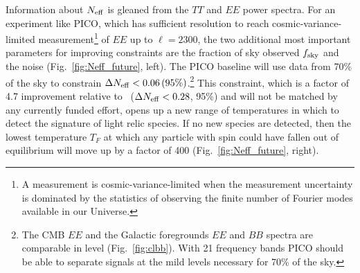 \documentclass[PICOReport.tex]{subfiles}
\begin{document}
Information about ${N_{\rm eff}}$ is gleaned from the $TT$ and $EE$ power spectra. For an experiment like PICO, which has sufficient resolution to reach cosmic-variance-limited measurement\footnote{A measurement is cosmic-variance-limited when the measurement uncertainty is dominated by the statistics of observing the finite number of Fourier modes available in our Universe.} of $EE$ up to $\ell =2300$, the two additional most important parameters for improving constraints are the fraction of sky observed $f_{\rm sky}$ and the noise (Fig.~\ref{fig:Neff_future}, left). The PICO baseline will use data from 70\% of the sky to constrain $\Delta {N_{\rm eff}} < 0.06 \, (95\%)$.\footnote{The CMB $EE$ and the Galactic foregrounds $EE$ and $BB$ spectra are comparable in level (Fig.~\ref{fig:clbb}). With 21 frequency bands PICO should be able to separate signals at the mild levels necessary for 70\% of the sky.} This constraint, which is a factor of 4.7 improvement relative to \planck~($\Delta {N_{\rm eff}} < 0.28$, 95\%) and will not be matched by any currently funded effort, opens up a new range of temperatures in which to detect the signature of light relic species. If no new species are detected, then the lowest temperature $T_{F}$ at which any particle with spin could have fallen out of equilibrium will move up by a factor of 400 (Fig.~\ref{fig:Neff_future}, right). 
\end{document}
